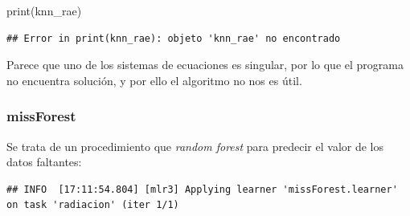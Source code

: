 \documentclass[
  11pt,
  a4paper,
]{article}
\newenvironment{Shaded}{\begin{snugshade}}{\end{snugshade}}
\newcommand{\AttributeTok}[1]{\textcolor[rgb]{0.77,0.63,0.00}{#1}}
\newcommand{\CommentTok}[1]{\textcolor[rgb]{0.56,0.35,0.01}{\textit{#1}}}
\newcommand{\DecValTok}[1]{\textcolor[rgb]{0.00,0.00,0.81}{#1}}
\newcommand{\FunctionTok}[1]{\textcolor[rgb]{0.00,0.00,0.00}{#1}}
\newcommand{\NormalTok}[1]{#1}
\newcommand{\OtherTok}[1]{\textcolor[rgb]{0.56,0.35,0.01}{#1}}
\newcommand{\SpecialCharTok}[1]{\textcolor[rgb]{0.00,0.00,0.00}{#1}}
\newcommand{\StringTok}[1]{\textcolor[rgb]{0.31,0.60,0.02}{#1}}
\begin{document}
\begin{Shaded}
\begin{Highlighting}[]
\FunctionTok{print}\NormalTok{(knn\_rae)}
\end{Highlighting}
\end{Shaded}

\begin{verbatim}
## Error in print(knn_rae): objeto 'knn_rae' no encontrado
\end{verbatim}

Parece que uno de los sistemas de ecuaciones es singular, por lo que el
programa no encuentra solución, y por ello el algoritmo no nos es útil.

\subsubsection{missForest}

Se trata de un procedimiento que \emph{random forest} para predecir el
valor de los datos faltantes:

\begin{Shaded}
\end{Shaded}

\begin{verbatim}
## INFO  [17:11:54.804] [mlr3] Applying learner 'missForest.learner' on task 'radiacion' (iter 1/1)
\end{verbatim}
\end{document}
